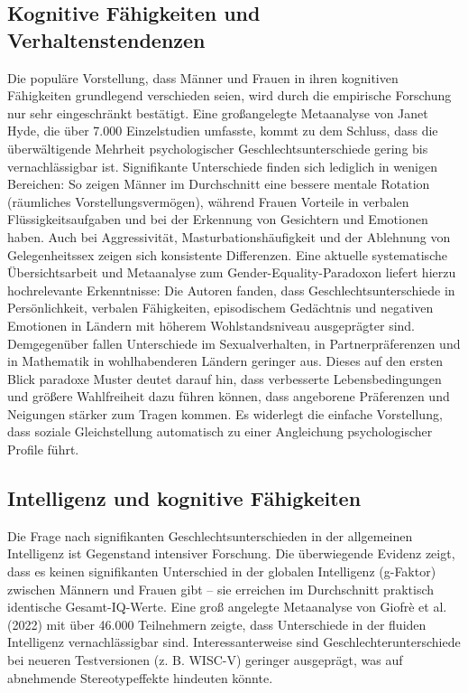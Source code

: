 \documentclass[12pt,a4paper]{article}
\begin{document}
	\subsection{Kognitive Fähigkeiten und Verhaltenstendenzen}
	Die populäre Vorstellung, dass Männer und Frauen in ihren kognitiven Fähigkeiten grundlegend verschieden seien, wird durch die empirische Forschung nur sehr eingeschränkt bestätigt. Eine großangelegte Metaanalyse von Janet Hyde, die über 7.000 Einzelstudien umfasste, kommt zu dem Schluss, dass die überwältigende Mehrheit psychologischer Geschlechtsunterschiede gering bis vernachlässigbar ist. \cite{DWDS} Signifikante Unterschiede finden sich lediglich in wenigen Bereichen: So zeigen Männer im Durchschnitt eine bessere mentale Rotation (räumliches Vorstellungsvermögen), während Frauen Vorteile in verbalen Flüssigkeitsaufgaben und bei der Erkennung von Gesichtern und Emotionen haben. Auch bei Aggressivität, Masturbationshäufigkeit und der Ablehnung von Gelegenheitssex zeigen sich konsistente Differenzen. \cite{DWDS}
	Eine aktuelle systematische Übersichtsarbeit und Metaanalyse zum Gender-Equality-Paradoxon liefert hierzu hochrelevante Erkenntnisse: Die Autoren fanden, dass Geschlechtsunterschiede in Persönlichkeit, verbalen Fähigkeiten, episodischem Gedächtnis und negativen Emotionen in Ländern mit höherem Wohlstandsniveau ausgeprägter sind. Demgegenüber fallen Unterschiede im Sexualverhalten, in Partnerpräferenzen und in Mathematik in wohlhabenderen Ländern geringer aus. \cite{Herlitz2025} Dieses auf den ersten Blick paradoxe Muster deutet darauf hin, dass verbesserte Lebensbedingungen und größere Wahlfreiheit dazu führen können, dass angeborene Präferenzen und Neigungen stärker zum Tragen kommen. Es widerlegt die einfache Vorstellung, dass soziale Gleichstellung automatisch zu einer Angleichung psychologischer Profile führt.
	
	\subsection{Intelligenz und kognitive Fähigkeiten}
	Die Frage nach signifikanten Geschlechtsunterschieden in der allgemeinen Intelligenz ist Gegenstand intensiver Forschung. Die überwiegende Evidenz zeigt, dass es keinen signifikanten Unterschied in der globalen Intelligenz (g-Faktor) zwischen Männern und Frauen gibt – sie erreichen im Durchschnitt praktisch identische Gesamt-IQ-Werte. Eine groß angelegte Metaanalyse von Giofrè et al. (2022) mit über 46.000 Teilnehmern zeigte, dass Unterschiede in der fluiden Intelligenz vernachlässigbar sind. Interessanterweise sind Geschlechterunterschiede bei neueren Testversionen (z. B. WISC-V) geringer ausgeprägt, was auf abnehmende Stereotypeffekte hindeuten könnte. \cite{Giofre2022}
	
\end{document}

